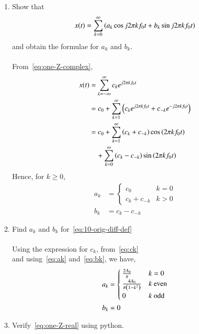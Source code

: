 \documentclass[journal,12pt,twocolumn]{IEEEtran}
\renewcommand\thesection{\arabic{section}}
\begin{document}
\begin{enumerate}[label=\thesection.\arabic*,ref=\thesection.\theenumi]
\item Show that 
	\begin{align}
		x(t) = \sum_{k = 0}^{\infty}\left(a_k\cos{j2\pi kf_0 t}+b_k\sin{j2\pi kf_0 t}\right)
	\label{eq:one-Z-real}
	\end{align}
	and obtain the formulae for $a_k$ and $b_k$. \\
	\solution\\
	\solution From~\eqref{eq:one-Z-complex},
	\begin{align*}
		x(t) &= \sum_{k = -\infty}^{\infty}c_k e^{j2\pi kf_0 t} \\
		&= c_0 + \sum_{k = 1}^{\infty} \left(c_k e^{j2\pi kf_0 t} + c_{-k}e^{-j2\pi kf_0 t}\right) \\
		&= c_0 + \sum_{k = 1}^{\infty} \left(c_k + c_{-k}\right)\cos\left(2\pi kf_0 t\right) \\
		& \quad + \sum_{k = 0}^{\infty}\left(c_k - c_{-k}\right)\sin\left(2\pi kf_0 t\right)
	\end{align*}
	Hence, for \( k \ge 0 \),
	\begin{align}
		a_k &= 
		\begin{cases}
			c_0 & k = 0 \\
			c_k + c_{-k} & k > 0
		\end{cases}
		\label{eq:ak} \\
		b_k &= c_k - c_{-k}
		\label{eq:bk}
	\end{align}
	

\item Find $a_k$ and $b_k$ for~\eqref{eq:10-orig-diff-def} \\
	\solution \\
	Using the expression for \( c_k \), from~\eqref{eq:ck} \\
	and using~\eqref{eq:ak} and~\eqref{eq:bk}, we have,
	\begin{align*}
		a_k &= 
			\begin{cases}
				\frac{2A_0}{\pi} & k = 0 \\
				\frac{4A_0}{\pi\left(1-k^2\right)} & k \text{ even} \\
				0 & k \text{ odd}
			\end{cases} \\
		b_k &= 0
	\end{align*}

\item Verify~\eqref{eq:one-Z-real} using python.

\end{enumerate}
\end{document}
